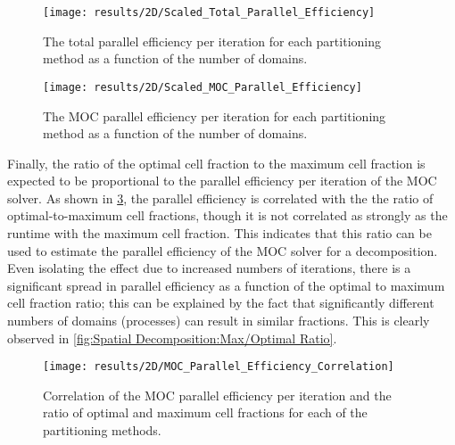 {{{{        \begin{figure}
          \centering
          \texttt{[image: results/2D/Scaled\_Total\_Parallel\_Efficiency]}
          \caption{The total parallel efficiency per iteration for each partitioning method as a function of the number of domains. \label{fig:Spatial Decomposition:Scaled Parallel Efficiency}}
        \end{figure}

        \begin{figure}
          \centering
          \texttt{[image: results/2D/Scaled\_MOC\_Parallel\_Efficiency]}
          \caption{The \ac{MOC} parallel efficiency per iteration for each partitioning method as a function of the number of domains. \label{fig:Spatial Decomposition:Scaled MOC Parallel Efficiency}}
        \end{figure}


        Finally, the ratio of the optimal cell fraction to the maximum cell fraction is expected to be proportional to the parallel efficiency per iteration of the \ac{MOC} solver.
        As shown in \cref{fig:Spatial Decomposition:MOC Parallel Efficiency Correlation}, the parallel efficiency is correlated with the the ratio of optimal-to-maximum cell fractions, though it is not correlated as strongly as the runtime with the maximum cell fraction.
        This indicates that this ratio can be used to estimate the parallel efficiency of the \ac{MOC} solver for a decomposition.
        Even isolating the effect due to increased numbers of iterations, there is a significant spread in parallel efficiency as a function of the optimal to maximum cell fraction ratio; this can be explained by the fact that significantly different numbers of domains (processes) can result in similar fractions.
        This is clearly observed in \cref{fig:Spatial Decomposition:Max/Optimal Ratio}.

        \begin{figure}
          \centering
          \texttt{[image: results/2D/MOC\_Parallel\_Efficiency\_Correlation]}
          \caption{Correlation of the \ac{MOC} parallel efficiency per iteration and the ratio of optimal and maximum cell fractions for each of the partitioning methods. \label{fig:Spatial Decomposition:MOC Parallel Efficiency Correlation}}
        \end{figure}
      }
}}}
